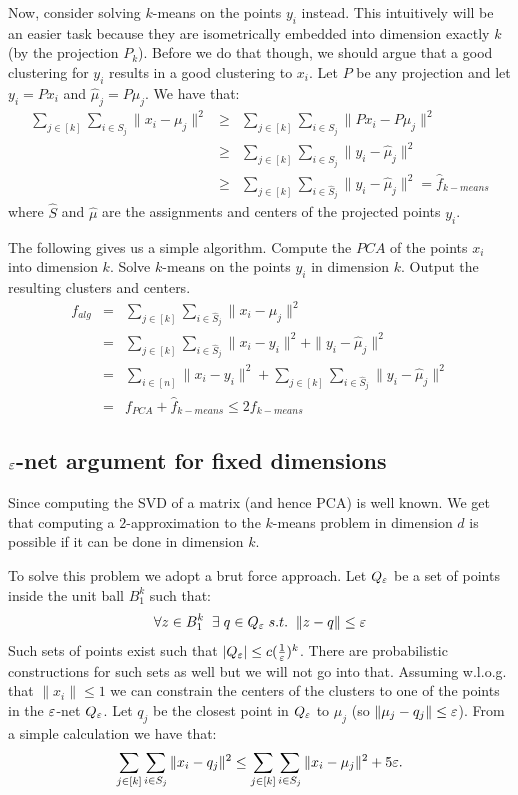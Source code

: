\documentclass{article}
\begin{document}
Now, consider solving $k$-means on the points $y_i$ instead. This intuitively will be an easier task
because they are isometrically embedded into dimension exactly $k$ (by the projection $P_k$). 
Before we do that though, we should argue that a good clustering for $y_i$ results in a good clustering to $x_i$.
Let $P$ be any projection and let $y_i = Px_i$ and $\hat{\mu}_{j} = P{\mu}_{j}$. We have that:
\begin{eqnarray}
\sum_{j \in [k]} \sum_{i \in S_j}  \|x_i - \mu_j \|^2 &\ge& \sum_{j \in [k]} \sum_{i \in S_j}  \|Px_i - P\mu_j \|^2 \\
&\ge& \sum_{j \in [k]} \sum_{i \in S_j}  \|y_i - \hat{\mu}_{j}\|^2 \\
&\ge& \sum_{j \in [k]} \sum_{i \in \hat{S}_j}  \|y_i - \hat{\mu}_{j}\|^2 = \hat{f}_{k-means}
\end{eqnarray}
where $\hat{S}$ and $\hat{\mu}$ are the assignments and centers of the projected points $y_i$.


The following gives us a simple algorithm. Compute the $PCA$ of the points $x_i$ into dimension $k$.
Solve $k$-means on the points $y_i$ in dimension $k$. Output the resulting clusters and centers.
\begin{eqnarray}
f_{alg} &=& \sum_{j \in [k]} \sum_{i \in \hat{S}_j} \|x_i -\hat{\mu}_j \|^2 \\
&=& \sum_{j \in [k]} \sum_{i \in \hat{S}_j} \|x_i -y_i \|^2 + \|y_i - \hat{\mu}_j\|^2 \\
&= & \sum_{i \in [n]} \|x_i -y_i \|^2 + \sum_{j \in [k]} \sum_{i \in \hat{S}_j}\|y_i - \hat{\mu}_j\|^2 \\
&=& f_{PCA} + \hat{f}_{k-means} \le 2f_{k-means}
\end{eqnarray}

\subsection{$\varepsilon$-net argument for fixed dimensions}
Since computing the SVD of a matrix (and hence PCA) is well known. 
We get that computing a $2$-approximation to 
the $k$-means problem in dimension $d$ is possible if it can be done in dimension $k$.

To solve this problem we adopt a brut force approach.
Let $Q_{\varepsilon}$ be a set of points inside the unit ball $B^{k}_{1}$ such that:
\[
\forall z \in B^{k}_{1} \;\; \exists \; q \in Q_{\varepsilon} \; s.t. \;\; \|z - q\| \le \varepsilon
\]
Such sets of points exist such that  $|Q_{\varepsilon}| \le c(\frac{1}{\varepsilon})^k$. There are 
probabilistic constructions for such sets as well but we will not go into that.
Assuming w.l.o.g. that $\|x_i\| \le 1$ we can constrain the centers of 
the clusters to one of the points in the $\varepsilon$-net $Q_{\varepsilon}$.
Let $q_j$ be the closest point in $Q_{\varepsilon}$ to $\mu_j$ (so $\|\mu_j - q_j \| \le \varepsilon$).
From a simple calculation we have that:
\[
\sum_{j \in [k]} \sum_{i \in S_j} \|x_i - q_j \|^2 \le  \sum_{j \in [k]} \sum_{i \in S_j} \|x_i - \mu_j \|^2 + 5\varepsilon.
\]
 
\end{document}
